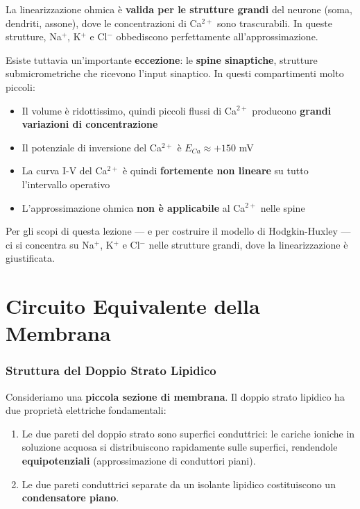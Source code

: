 La linearizzazione ohmica è \textbf{valida per le strutture grandi} del neurone (soma, dendriti, assone), dove le concentrazioni di Ca$^{2+}$ sono trascurabili. In queste strutture, Na$^+$, K$^+$ e Cl$^-$ obbediscono perfettamente all'approssimazione.

Esiste tuttavia un'importante \textbf{eccezione}: le \textbf{spine sinaptiche}, strutture submicrometriche che ricevono l'input sinaptico. In questi compartimenti molto piccoli:

\begin{itemize}
    \item Il volume è ridottissimo, quindi piccoli flussi di Ca$^{2+}$ producono \textbf{grandi variazioni di concentrazione}
    \item Il potenziale di inversione del Ca$^{2+}$ è $E_{Ca} \approx +150$ mV
    \item La curva I-V del Ca$^{2+}$ è quindi \textbf{fortemente non lineare} su tutto l'intervallo operativo
    \item L'approssimazione ohmica \textbf{non è applicabile} al Ca$^{2+}$ nelle spine
\end{itemize}

Per gli scopi di questa lezione — e per costruire il modello di Hodgkin-Huxley — ci si concentra su Na$^+$, K$^+$ e Cl$^-$ nelle strutture grandi, dove la linearizzazione è giustificata.


\section{Circuito Equivalente della Membrana}

\subsubsection{Struttura del Doppio Strato Lipidico}

Consideriamo una \textbf{piccola sezione di membrana}. Il doppio strato lipidico ha due proprietà elettriche fondamentali:

\begin{enumerate}
    \item Le due pareti del doppio strato sono superfici conduttrici: le cariche ioniche in soluzione acquosa si distribuiscono rapidamente sulle superfici, rendendole \textbf{equipotenziali} (approssimazione di conduttori piani).
    \item Le due pareti conduttrici separate da un isolante lipidico costituiscono un \textbf{condensatore piano}.
\end{enumerate}

